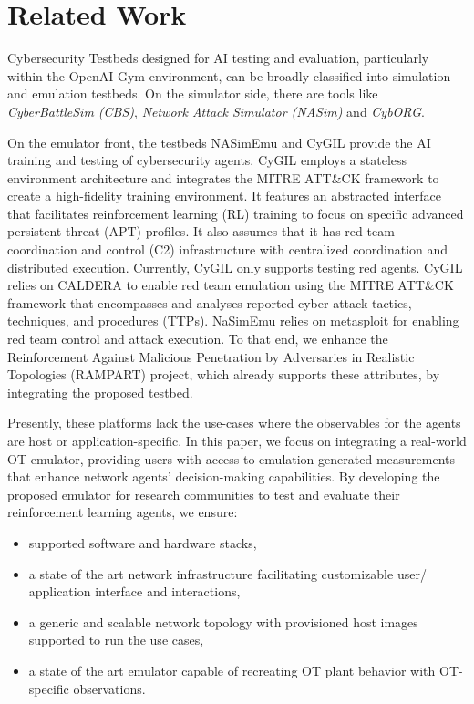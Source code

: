 \section{Related Work}
\label{sec:related}
Cybersecurity Testbeds designed for AI testing and evaluation, particularly within the OpenAI Gym environment, can be broadly classified into simulation and emulation testbeds. On the simulator side, there are tools like \textit{CyberBattleSim (CBS)}, \textit{Network Attack Simulator (NASim)} and \textit{CybORG}. 

On the emulator front, the testbeds NASimEmu \cite{janisch2023nasimemunetworkattacksimulator} and  CyGIL \cite{li2021cygil} provide the AI training and testing of cybersecurity agents. 
CyGIL \cite{li2021cygil} employs a stateless environment architecture and integrates the MITRE ATT\&CK framework to create a high-fidelity training environment. It features an abstracted interface that facilitates reinforcement learning (RL) training to focus on specific advanced persistent threat (APT) profiles. It also assumes that it has red team coordination and control (C2) infrastructure with centralized coordination and distributed execution. 
Currently, CyGIL only supports testing red agents. CyGIL relies on CALDERA to enable red team emulation
using the MITRE ATT\&CK framework that encompasses and analyses reported cyber-attack tactics, techniques, and procedures (TTPs). NaSimEmu relies on metasploit for enabling red team control and attack execution. To that end, we enhance the Reinforcement Against Malicious Penetration by Adversaries in Realistic Topologies (RAMPART) \cite{10564815} project, which already supports these attributes, by integrating the proposed testbed.


Presently, these platforms lack the use-cases where the observables for the agents are host or application-specific. In this paper, we focus on integrating a real-world OT emulator, providing users with access to emulation-generated measurements that enhance network agents' decision-making capabilities. By developing the proposed emulator for research communities to test and evaluate their reinforcement learning agents, we ensure:
\begin{itemize}
    \item supported software and hardware stacks,
    \item a state of the art network infrastructure facilitating customizable user/ application interface and interactions,
    \item a generic and scalable network topology with provisioned host images supported to run the use cases,
    \item a state of the art emulator capable of recreating OT plant behavior with OT-specific observations.
\end{itemize}

